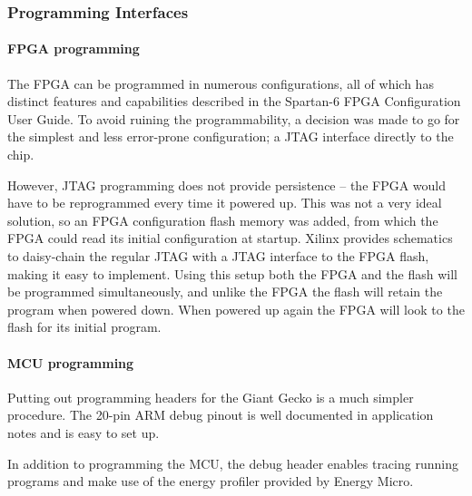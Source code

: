 
\subsubsection{Programming Interfaces}

\paragraph{FPGA programming} The FPGA can be programmed in
numerous configurations, all of which has distinct features and
capabilities described in the Spartan-6 FPGA Configuration User
Guide. To avoid ruining the programmability, a decision was made
to go for the simplest and less error-prone
configuration; a JTAG interface directly to the chip.

However, JTAG programming does not provide persistence -- the
FPGA would have to be reprogrammed every time it powered up.
This was not a very ideal solution, so an FPGA
configuration flash memory was added, from which the FPGA could read its
initial configuration at startup. Xilinx provides schematics to
daisy-chain the regular JTAG with a JTAG interface to the FPGA
flash, making it easy to implement. Using this setup both the
FPGA and the flash will be programmed simultaneously, and unlike
the FPGA the flash will retain the program when powered down.
When powered up again the FPGA will look to the flash for its
initial program.

\paragraph{MCU programming} Putting out programming headers for
the Giant Gecko is a much simpler procedure. The 20-pin ARM
debug pinout is well documented in application notes and is easy
to set up.

In addition to programming the MCU, the debug header enables
tracing running programs and make use of the energy profiler
provided by Energy Micro.
